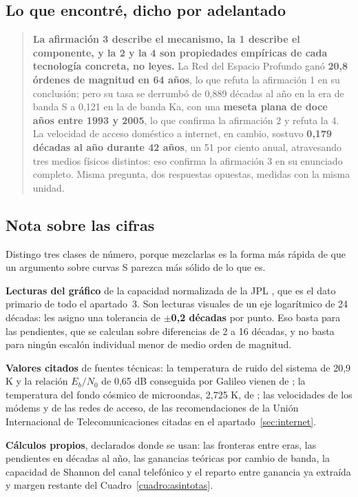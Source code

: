\documentclass[11pt,letterpaper]{article}
\begin{document}
\subsection*{Lo que encontré, dicho por adelantado}

\begin{quote}
\textbf{La afirmación 3 describe el mecanismo, la 1 describe el componente, y
la 2 y la 4 son propiedades empíricas de cada tecnología concreta, no leyes.}
La Red del Espacio Profundo ganó \textbf{20,8 órdenes de magnitud en 64 años},
lo que refuta la afirmación 1 en su conclusión; pero su tasa se derrumbó de
0,889 décadas al año en la era de banda S a 0,121 en la de banda Ka, con una
\textbf{meseta plana de doce años entre 1993 y 2005}, lo que confirma la
afirmación 2 y refuta la 4. La velocidad de acceso doméstico a internet, en
cambio, sostuvo \textbf{0,179 décadas al año durante 42 años}, un
\num{51} por ciento anual, atravesando tres medios físicos distintos: eso
confirma la afirmación 3 en su enunciado completo. Misma pregunta, dos
respuestas opuestas, medidas con la misma unidad.
\end{quote}

\subsection*{Nota sobre las cifras}

Distingo tres clases de número, porque mezclarlas es la forma más rápida de
que un argumento sobre curvas S parezca más sólido de lo que es.

\textbf{Lecturas del gráfico} de la capacidad normalizada de la JPL
\parencite{descanso2015}, que es el dato primario de todo el apartado~3. Son
lecturas visuales de un eje logarítmico de 24 décadas: les asigno una
tolerancia de \textbf{$\pm$0,2 décadas} por punto. Eso basta para las
pendientes, que se calculan sobre diferencias de 2 a 16 décadas, y no basta
para ningún escalón individual menor de medio orden de magnitud.

\textbf{Valores citados} de fuentes técnicas: la temperatura de ruido del
sistema de 20,9 K y la relación $E_b/N_0$ de 0,65 dB conseguida por Galileo
vienen de \textcite{layland1997}; la temperatura del fondo cósmico de
microondas, 2,725 K, de \textcite{fixsen2009}; las velocidades de los módems y
de las redes de acceso, de las recomendaciones de la Unión Internacional de
Telecomunicaciones citadas en el apartado~\ref{sec:internet}.

\textbf{Cálculos propios}, declarados donde se usan: las fronteras entre eras,
las pendientes en décadas al año, las ganancias teóricas por cambio de banda,
la capacidad de Shannon del canal telefónico y el reparto entre ganancia ya
extraída y margen restante del Cuadro~\ref{cuadro:asintotas}.
\end{document}
